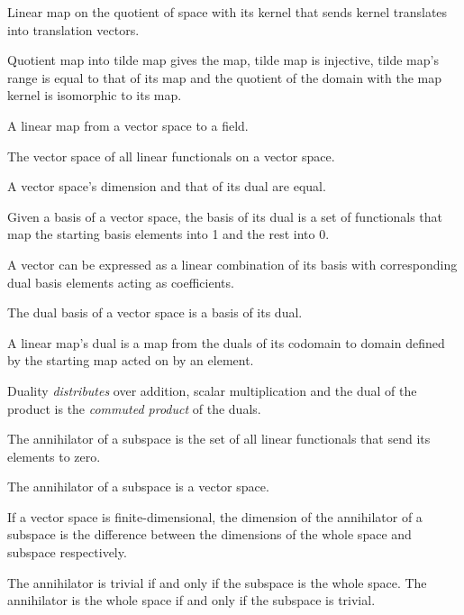\begin{multicols}{3}
  Linear map on the quotient of space with its kernel that
  sends kernel translates into translation vectors.

  Quotient map into tilde map gives the map, tilde map is injective,
  tilde map's range is equal to that of its map and
  the quotient of the domain with the map kernel is isomorphic
  to its map.


  A linear map from a vector space to a field.

  The vector space of all linear functionals on a vector space.

  A vector space's dimension and that of its dual are equal.

  Given a basis of a vector space, the basis of its dual
  is a set of functionals that map the starting basis elements
  into 1 and the rest into 0.

  A vector can be expressed as a linear combination of its
  basis with corresponding dual basis elements acting as
  coefficients.

  The dual basis of a vector space is a basis of its dual.

  A linear map's dual is a map from the duals of its codomain
  to domain defined by the starting map acted on by an element.

  Duality \textit{distributes} over addition, scalar multiplication
  and the dual of the product is the \textit{commuted product} of the duals.

  The annihilator of a subspace is the set of all linear functionals that send its elements to zero.

  The annihilator of a subspace is a vector space.

  If a vector space is finite-dimensional, the dimension of the annihilator of a subspace is the difference
  between the dimensions of the whole space and subspace respectively.

  The annihilator is trivial if and only if the subspace is the whole space.
  The annihilator is the whole space if and only if the subspace is trivial.


\end{multicols}
